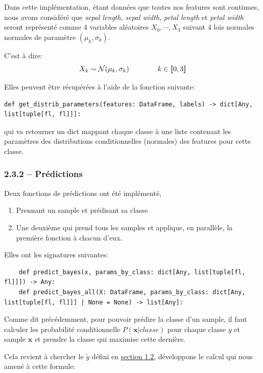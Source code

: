 \documentclass[
]{article}
\providecommand{\tightlist}{%
  \setlength{\itemsep}{0pt}\setlength{\parskip}{0pt}}
\begin{document}
Dans cette implémentation, étant données que toutes nos features sont
continues, nous avons considéré que \emph{sepal length}, \emph{sepal
width}, \emph{petal length} et \emph{petal width} seront représenté
comme 4 variables aléatoires \(X_0, \cdots, X_3\) suivant 4 lois
normales normales de paramètre \((\mu_k, \sigma_k)\).

C'est à dire: \[
X_k \sim \mathcal{N}( \mu_k, \sigma_k) \qquad \qquad k \in \llbracket{0, 3}\rrbracket
\]

Elles peuvent être récupérées à l'aide de la fonction suivante:

\begin{lstlisting}
def get_distrib_parameters(features: DataFrame, labels) -> dict[Any, list[tuple[fl, fl]]]:
\end{lstlisting}

qui va retourner un dict mappant chaque classe à une liste contenant les
paramètres des distributions conditionnelles (normales) des features
pour cette classe.

\subsubsection{2.3.2 -- Prédictions}\label{pruxe9dictions-1}

Deux fonctions de prédictions ont été implémenté,

\begin{enumerate}
\def\labelenumi{\arabic{enumi}.}
\tightlist
\item
  Prennant un sample et prédisant sa classe
\item
  Une deuxième qui prend tous les samples et applique, en parallèle, la
  première fonction à chacun d'eux.
\end{enumerate}

Elles ont les signatures suivantes:

\begin{lstlisting}
    def predict_bayes(x, params_by_class: dict[Any, list[tuple[fl, fl]]]) -> Any:
    def predict_bayes_all(X: DataFrame, params_by_class: dict[Any, list[tuple[fl, fl]]] | None = None) -> list[Any]:
\end{lstlisting}

Comme dit précédemment, pour pouvoir prédire la classe d'un sample, il
faut calculer les probabilité conditionnelle \(P(\mathbf{x}| classe)\)
pour chaque classe \(y\) et sample \(\mathbf{x}\) et prendre la classe
qui maximise cette dernière.

Cela revient à chercher le \(\tilde{y}\) défini en
\href{#naive-bayes}{section 1.2}, développons le calcul qui nous amené à
cette formule:
\end{document}

